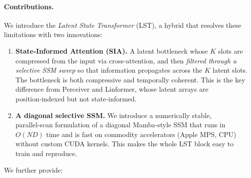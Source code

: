 \documentclass[10pt,twocolumn,letterpaper]{article}
\newcommand{\LST}{\textsc{LST}}
\newcommand{\SIA}{\textsc{SIA}}
\begin{document}
\paragraph{Contributions.}  We introduce the \emph{Latent State Transformer} (\LST{}), a hybrid that resolves these limitations with two innovations:
\begin{enumerate}[leftmargin=*,topsep=2pt,itemsep=1pt]
\item \textbf{State‑Informed Attention (\SIA{}).}  A latent bottleneck whose $K$ slots are compressed from the input via cross‑attention, and then \emph{filtered through a selective SSM sweep} so that information propagates across the $K$ latent slots.  The bottleneck is both compressive and temporally coherent.  This is the key difference from Perceiver and Linformer, whose latent arrays are position‑indexed but not state‑informed.
\item \textbf{A diagonal selective SSM.}  We introduce a numerically stable, parallel‑scan formulation of a diagonal Mamba‑style SSM that runs in $O(ND)$ time and is fast on commodity accelerators (Apple MPS, CPU) without custom CUDA kernels.  This makes the whole \LST{} block easy to train and reproduce.
\end{enumerate}
We further provide:
\end{document}
